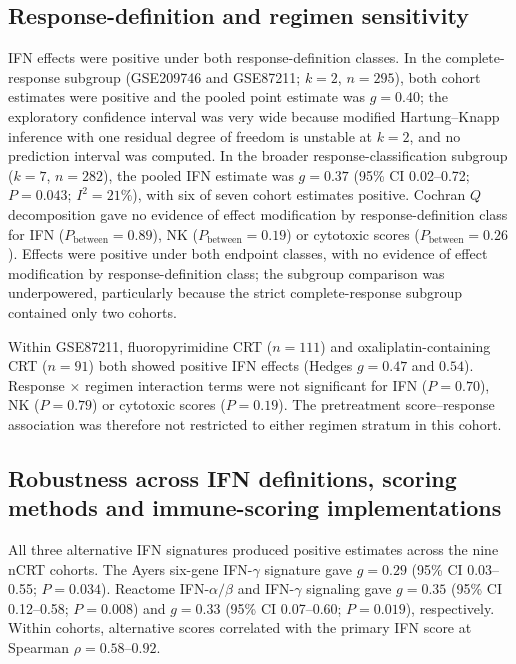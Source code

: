 \documentclass[11pt,a4paper]{article}
\begin{document}
\subsection{Response-definition and regimen sensitivity}

IFN effects were positive under both response-definition classes. In the complete-response subgroup (GSE209746 and GSE87211; $k=2$, $n=295$), both cohort estimates were positive and the pooled point estimate was $g=0.40$; the exploratory confidence interval was very wide because modified Hartung--Knapp inference with one residual degree of freedom is unstable at $k=2$, and no prediction interval was computed. In the broader response-classification subgroup ($k=7$, $n=282$), the pooled IFN estimate was $g=0.37$ (95\% CI 0.02--0.72; $P=0.043$; $I^2=21\%$), with six of seven cohort estimates positive. Cochran $Q$ decomposition gave no evidence of effect modification by response-definition class for IFN ($P_{\mathrm{between}}=0.89$), NK ($P_{\mathrm{between}}=0.19$) or cytotoxic scores ($P_{\mathrm{between}}=0.26$). Effects were positive under both endpoint classes, with no evidence of effect modification by response-definition class; the subgroup comparison was underpowered, particularly because the strict complete-response subgroup contained only two cohorts.

Within GSE87211, fluoropyrimidine CRT ($n=111$) and oxaliplatin-containing CRT ($n=91$) both showed positive IFN effects (Hedges $g=0.47$ and $0.54$). Response $\times$ regimen interaction terms were not significant for IFN ($P=0.70$), NK ($P=0.79$) or cytotoxic scores ($P=0.19$). The pretreatment score--response association was therefore not restricted to either regimen stratum in this cohort.

\subsection{Robustness across IFN definitions, scoring methods and immune-scoring implementations}

All three alternative IFN signatures produced positive estimates across the nine nCRT cohorts. The Ayers six-gene IFN-$\gamma$ signature gave $g=0.29$ (95\% CI 0.03--0.55; $P=0.034$). Reactome IFN-$\alpha/\beta$ and IFN-$\gamma$ signaling gave $g=0.35$ (95\% CI 0.12--0.58; $P=0.008$) and $g=0.33$ (95\% CI 0.07--0.60; $P=0.019$), respectively. Within cohorts, alternative scores correlated with the primary IFN score at Spearman $\rho=0.58$--$0.92$.
\end{document}
